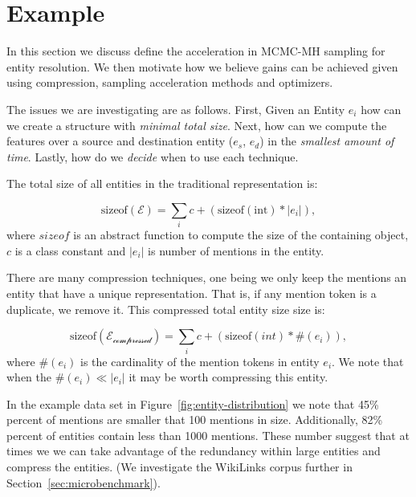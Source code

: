
\section{Example}

In this section we discuss define the acceleration in MCMC-MH sampling for entity resolution.
We then motivate how we believe gains can be achieved given using compression, sampling acceleration methods and optimizers.

The issues we are investigating are as follows.
First, Given an Entity $e_i$ how can we create a structure with \textit{minimal total size}.
Next, how can we compute the features over a source and destination entity ($e_s$, $e_d$) 
in the \textit{smallest amount of time}.
Lastly, how do we \textit{decide} when to use each technique.


The total size of all entities in the traditional representation is:

\begin{equation}
  \text{sizeof}(\mathcal{E}) =  \sum_i c + (\text{sizeof}(\text{int}) * |e_i|),
\end{equation}
where $sizeof$ is an abstract function to compute the size of the containing object,
$c$ is a class constant and $|e_i|$ is number of mentions in the entity.

There are many compression techniques, one being we only keep the mentions an entity
that have a unique representation.
That is, if any mention token is a duplicate, we remove it.
This compressed total entity size size is:

\begin{equation}
  \text{sizeof}(\mathcal{E_\text{compressed}}) = \sum_i c + (\text{sizeof}(int) * \#(e_i) ),
\end{equation}
where $\#(e_i)$ is the cardinality of the mention tokens in entity $e_i$.
We note that when the $\#(e_i) \ll |e_i|$ it may be worth compressing this entity.


In the example data set in Figure~\ref{fig:entity-distribution} we note that
45\% percent of mentions are smaller that 100 mentions in size.
Additionally, 82\% percent of entities contain less than 1000 mentions.
These number suggest that at times we 
we can take advantage of the redundancy within
large entities and compress the entities.
(We investigate the WikiLinks corpus further in Section~\ref{sec:microbenchmark}). 



